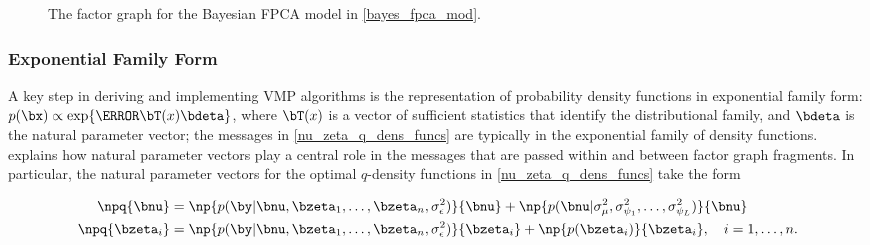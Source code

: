 \documentclass[12pt]{article}
\def\sigsqeps{\sigma^2_{\epsilon}}
\def\sigsqmu{\sigma^2_{\mu}}
\newcommand\sigsqpsi[1]{\sigma^2_{\psi_{#1}}}
\theoremstyle{plain}
\theoremstyle{definition}
\theoremstyle{remark}
\begin{document}
\begin{figure}
\caption{The factor graph for the Bayesian FPCA model in \eqref{bayes_fpca_mod}.}
\label{fig:fg_fpca}
\end{figure}


\subsubsection{Exponential Family Form}
\label{sec:exp_fam_form}

A key step in deriving and implementing VMP algorithms is the representation of probability density functions
in exponential family form: $p (\bx) \propto \exp \{ \T{\bT(x)} \bdeta \}$, where $\bT (x)$ is a vector of sufficient
statistics that identify the distributional family, and $\bdeta$ is the natural parameter vector;
the messages in \eqref{nu_zeta_q_dens_funcs} are typically in the exponential family of density functions.
 explains how natural parameter vectors play a central role in the messages that are
passed within and between factor graph fragments. In particular, the natural parameter vectors for the
optimal $q$-density functions in \eqref{nu_zeta_q_dens_funcs} take the form

\begin{align}
\begin{split}
	\npq{\bnu} &=
		\np{p (\by | \bnu, \bzeta_1, \dots, \bzeta_n, \sigsqeps)}{\bnu} +
		\np{p (\bnu | \sigsqmu, \sigsqpsi{1}, \dots, \sigsqpsi{L})}{\bnu} \\
	\npq{\bzeta_i} &=
		\np{p (\by | \bnu, \bzeta_1, \dots, \bzeta_n, \sigsqeps)}{\bzeta_i} +
		\np{p (\bzeta_i)}{\bzeta_i} , \quad i = 1, \dots, n.
\end{split}
\label{etaq}
\end{align}
\end{document}
